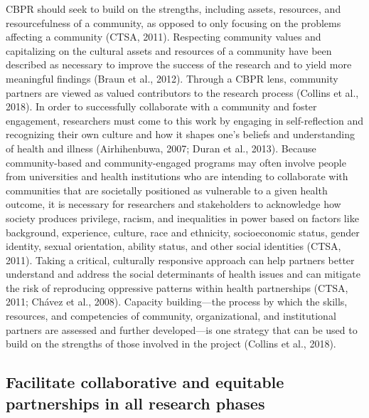 \documentclass[
  11pt,
]{book}
\begin{document}
CBPR should seek to build on the strengths, including assets, resources, and resourcefulness of a community, as opposed to only focusing on the problems affecting a community (CTSA, 2011). Respecting community values and capitalizing on the cultural assets and resources of a community have been described as necessary to improve the success of the research and to yield more meaningful findings (Braun et al., 2012). Through a CBPR lens, community partners are viewed as valued contributors to the research process (Collins et al., 2018). In order to successfully collaborate with a community and foster engagement, researchers must come to this work by engaging in self-reflection and recognizing their own culture and how it shapes one's beliefs and understanding of health and illness (Airhihenbuwa, 2007; Duran et al., 2013). Because community-based and community-engaged programs may often involve people from universities and health institutions who are intending to collaborate with communities that are societally positioned as vulnerable to a given health outcome, it is necessary for researchers and stakeholders to acknowledge how society produces privilege, racism, and inequalities in power based on factors like background, experience, culture, race and ethnicity, socioeconomic status, gender identity, sexual orientation, ability status, and other social identities (CTSA, 2011). Taking a critical, culturally responsive approach can help partners better understand and address the social determinants of health issues and can mitigate the risk of reproducing oppressive patterns within health partnerships (CTSA, 2011; Chávez et al., 2008). Capacity building---the process by which the skills, resources, and competencies of community, organizational, and institutional partners are assessed and further developed---is one strategy that can be used to build on the strengths of those involved in the project (Collins et al., 2018).

\subsection{Facilitate collaborative and equitable partnerships in all research phases}\label{facilitate-collaborative-and-equitable-partnerships-in-all-research-phases}
\end{document}

